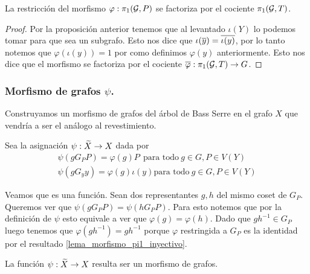 \documentclass[tesis.tex]{subfiles}
\begin{document}
\begin{coro}
	La restricción del morfismo $\varphi: \pi_1({\cal G}, P)$ se factoriza por el cociente $\pi_1({\cal G}, T)$.
\end{coro}
\begin{proof}
	Por la proposición anterior tenemos que al levantado $\iota(Y)$ lo podemos tomar para que sea un subgrafo.
	Esto nos dice que $\iota(\overline y) = \overline {\iota (y)}$, por lo tanto notemos que $\varphi(\iota(y)) = 1$ por como definimos $\varphi(y)$ anteriormente.
	Esto nos dice que el morfismo se factoriza por el cociente $\overline \varphi:\pi_1({\cal G}, T) \to G$.
\end{proof}

\subsubsection{Morfismo de grafos $\psi$.}

Construyamos un morfismo de grafos del árbol de Bass Serre en el grafo $X$ que vendría a ser el análogo al revestimiento.

Sea la asignación $\psi: \widetilde X \to X$ dada por 
\begin{align*}
	\psi(g G_P P) = \varphi(g) P \ \ \text{para todo} \ g \in G, P \in V(Y) \\
	\psi(g G_y y) = \varphi(g) \iota(y) \text{para todo} \ g \in G, P \in V(Y)
\end{align*}

Veamos que es una función.
Sean dos representantes $g,h$ del mismo coset de $G_P$. 
Queremos ver que $\psi(gG_PP) = \psi(hG_P P)$.
Para esto notemos que por la definición de $\psi$  esto equivale a ver que $\varphi(g) = \varphi(h)$.
Dado que $gh^{-1} \in G_P$ luego tenemos que $\varphi(gh^{-1}) = gh^{-1}$ porque $\varphi$ restringida a $G_P$ es la identidad por el resultado \ref{lema_morfismo_pi1_inyectivo}.

\begin{lema}
	La función $\psi: \widetilde X \to X$ resulta ser un morfismo de grafos.
\end{lema}
\end{document}

